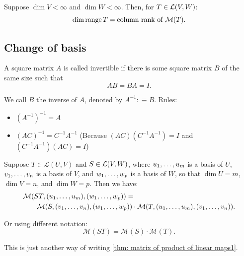   \setcounter{thm}{77}
  \begin{thm} 
    Suppose $\dim V < \infty$ and $\dim W < \infty$. Then, for $T \in \mathcal{L}(V,W)$:
    \begin{equation}
      \dim \operatorname{range} T = \text{column rank of } \mathcal{M} (T).
    \end{equation}
  \end{thm}

  \subsection{Change of basis}


  \setcounter{thm}{79}
  \begin{mydef}
    A square matrix $A$ is called invertible if there is some square matrix $B$ of the same size such that
    \begin{equation}
    	AB=BA=I.
    \end{equation}

    We call $B$ the inverse of $A$, denoted by $A^{-1} :\equiv B$. Rules:
    \begin{itemize}
      \item $(A^{-1})^{-1}=A$
      \item $(AC)^{-1} = C^{-1}A^{-1}$ (Because $(AC)(C^{-1}A^{-1})=I$ and $(C^{-1}A^{-1})(AC)=I$)
    \end{itemize}
  \end{mydef}

  \begin{thm} 
    \label{thm: matrix of product of linear maps2}
    Suppose $T\in \mathcal{L}(U,V)$ and $S\in {\mathcal{L}(V,W)}$, where $u_1, \dots, u_m$ is a basis of $U$, $v_1, \dots, v_n$ is a basis of $V$, and $w_1, \dots, w_{p}$ is a basis of $W$, so that $\dim U = m$, $\dim V = n$, and $\dim W = p$. Then we have:
    \begin{equation}
    \begin{aligned}
      &\mathcal{M}(ST, (u_1, \dots, u_m), (w_1, \dots, w_{p})) = \\
      &\qquad \mathcal{M}(S, (v_1, \dots, v_n), (w_1, \dots, w_{p} ))
      \cdot
      \mathcal{M}(T, (u_1, \dots, u_m), (v_1, \dots, v_n   )).
    \end{aligned}
    \end{equation}

    Or using different notation:
    \begin{equation}
      \mathcal{M}(ST) = \mathcal{M}(S) \cdot \mathcal{M}(T).
    \end{equation}
  \end{thm}
  \begin{prf}
    This is just another way of writing \ref{thm: matrix of product of linear maps1}.
  \end{prf}

